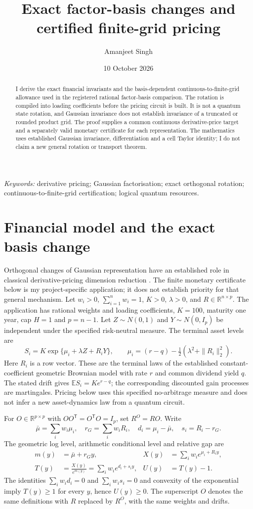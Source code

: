 \documentclass[11pt,a4paper]{article}
\title{Exact factor-basis changes and certified finite-grid pricing}
\author{Amanjeet Singh}
\date{10 October 2026}
\newcommand{\E}{\mathbb E}
\newcommand{\R}{\mathbb R}
\begin{document}
\maketitle
\begin{abstract}
I derive the exact financial invariants and the basis-dependent continuous-to-finite-grid allowance used in the registered rational factor-basis comparison. The rotation is compiled into loading coefficients before the pricing circuit is built. It is not a quantum state rotation, and Gaussian invariance does not establish invariance of a truncated or rounded product grid. The proof supplies a common continuous derivative-price target and a separately valid monetary certificate for each representation. The mathematics uses established Gaussian invariance, differentiation and a cell Taylor identity; I do not claim a new general rotation or transport theorem.
\end{abstract}
\noindent\textit{Keywords:} derivative pricing; Gaussian factorisation; exact orthogonal rotation; continuous-to-finite-grid certification; logical quantum resources.

\section{Financial model and the exact basis change}
Orthogonal changes of Gaussian representation have an established role in
classical derivative-pricing dimension reduction \citep{imai2006}.
The finite monetary certificate below is my project-specific application;
it does not establish priority for that general mechanism.
Let $w_i>0$, $\sum_{i=1}^n w_i=1$, $K>0$, $\lambda>0$, and
$R\in\R^{n\times p}$. The application has rational weights and loading
coefficients, $K=100$, maturity one year, cap $H=1$ and $p=n-1$.
Let $Z\sim N(0,1)$ and $Y\sim N(0,I_p)$ be independent under the specified
risk-neutral measure. The terminal asset levels are
\[
 S_i=K\exp\{\mu_i+\lambda Z+R_iY\},
 \qquad
 \mu_i=(r-q)-\tfrac12(\lambda^2+\|R_i\|_2^2).
\]
Here $R_i$ is a row vector. These are the terminal laws of the established
constant-coefficient geometric Brownian model with rate $r$ and common
dividend yield $q$. The stated drift gives
$\E S_i=K e^{r-q}$; the corresponding discounted gain processes are
martingales. Pricing below uses this specified no-arbitrage measure and
does not infer a new asset-dynamics law from a quantum circuit.

For $O\in\R^{p\times p}$ with $OO^\mathsf T=O^\mathsf TO=I_p$, set
$R^O=RO$. Write
\[
 \bar\mu=\sum_iw_i\mu_i,\quad
 r_G=\sum_iw_iR_i,\quad d_i=\mu_i-\bar\mu,\quad
 s_i=R_i-r_G.
\]
The geometric log level, arithmetic conditional level and relative gap are
\begin{align*}
 m(y)&=\bar\mu+r_Gy, &
 X(y)&=\sum_iw_i e^{\mu_i+R_i y},\\
 T(y)&=\frac{X(y)}{e^{m(y)}}=\sum_iw_i e^{d_i+s_i y},&
 U(y)&=T(y)-1.
\end{align*}
The identities $\sum_iw_i d_i=0$ and $\sum_iw_i s_i=0$ and convexity of
the exponential imply $T(y)\geq1$ for every $y$, hence $U(y)\geq0$.
The superscript $O$ denotes the same definitions with $R$ replaced by
$R^O$, with the same weights and drifts.
\end{document}
